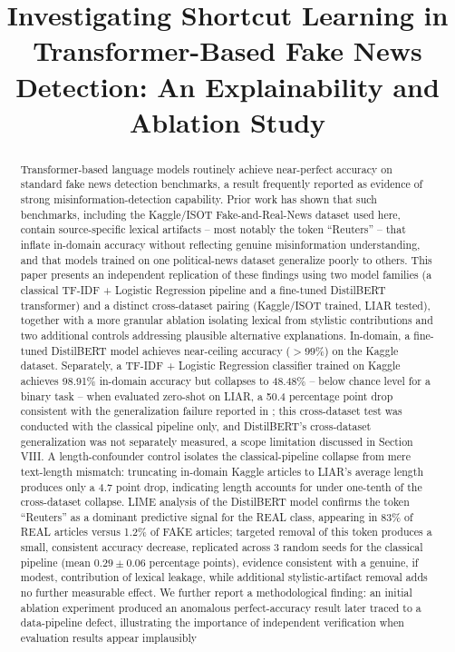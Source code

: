 \documentclass[conference]{IEEEtran}
\begin{document}
\title{Investigating Shortcut Learning in Transformer-Based Fake News Detection: An Explainability and Ablation Study}

\author{
}

\maketitle

\begin{abstract}
Transformer-based language models routinely achieve near-perfect accuracy on standard fake news detection benchmarks, a result frequently reported as evidence of strong misinformation-detection capability. Prior work \cite{hoy2022} has shown that such benchmarks, including the Kaggle/ISOT Fake-and-Real-News dataset used here, contain source-specific lexical artifacts -- most notably the token ``Reuters'' -- that inflate in-domain accuracy without reflecting genuine misinformation understanding, and that models trained on one political-news dataset generalize poorly to others. This paper presents an independent replication of these findings using two model families (a classical TF-IDF + Logistic Regression pipeline and a fine-tuned DistilBERT transformer) and a distinct cross-dataset pairing (Kaggle/ISOT trained, LIAR tested), together with a more granular ablation isolating lexical from stylistic contributions and two additional controls addressing plausible alternative explanations. In-domain, a fine-tuned DistilBERT model achieves near-ceiling accuracy ($>99\%$) on the Kaggle dataset. Separately, a TF-IDF + Logistic Regression classifier trained on Kaggle achieves 98.91\% in-domain accuracy but collapses to 48.48\% -- below chance level for a binary task -- when evaluated zero-shot on LIAR, a 50.4 percentage point drop consistent with the generalization failure reported in \cite{hoy2022}; this cross-dataset test was conducted with the classical pipeline only, and DistilBERT's cross-dataset generalization was not separately measured, a scope limitation discussed in Section VIII. A length-confounder control isolates the classical-pipeline collapse from mere text-length mismatch: truncating in-domain Kaggle articles to LIAR's average length produces only a 4.7 point drop, indicating length accounts for under one-tenth of the cross-dataset collapse. LIME analysis of the DistilBERT model confirms the token ``Reuters'' as a dominant predictive signal for the REAL class, appearing in 83\% of REAL articles versus 1.2\% of FAKE articles; targeted removal of this token produces a small, consistent accuracy decrease, replicated across 3 random seeds for the classical pipeline (mean $0.29 \pm 0.06$ percentage points), evidence consistent with a genuine, if modest, contribution of lexical leakage, while additional stylistic-artifact removal adds no further measurable effect. We further report a methodological finding: an initial ablation experiment produced an anomalous perfect-accuracy result later traced to a data-pipeline defect, illustrating the importance of independent verification when evaluation results appear implausibly 
\end{abstract}
\end{document}

